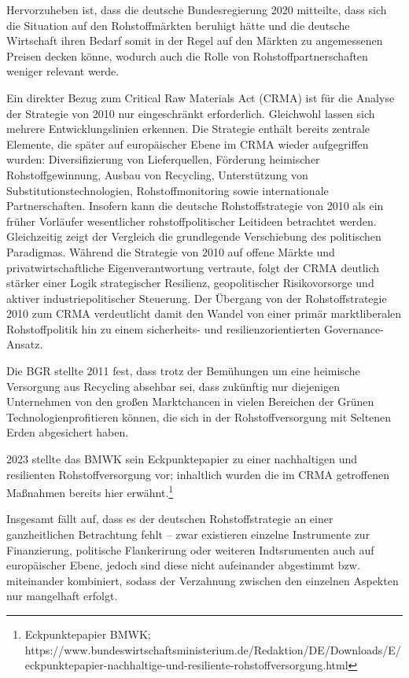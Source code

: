 \documentclass[12pt,a4paper,oneside]{book} %
\begin{document}
Hervorzuheben ist, dass die deutsche Bundesregierung 2020 mitteilte, dass sich die Situation auf den Rohstoffmärkten beruhigt hätte und die deutsche Wirtschaft ihren Bedarf somit in der Regel auf den Märkten zu angemessenen Preisen decken könne, wodurch auch die Rolle von Rohstoffpartnerschaften weniger relevant werde.\autocite{Bundesrechnungshof, Rohstoffpartnerschaften, 2021, S. 10; BtDrs 19/17224}

Ein direkter Bezug zum Critical Raw Materials Act (CRMA) ist für die Analyse der Strategie von 2010 nur eingeschränkt erforderlich. Gleichwohl lassen sich mehrere Entwicklungslinien erkennen.
Die Strategie enthält bereits zentrale Elemente, die später auf europäischer Ebene im CRMA wieder aufgegriffen wurden: Diversifizierung von Lieferquellen, Förderung heimischer Rohstoffgewinnung, Ausbau von Recycling, Unterstützung von Substitutionstechnologien, Rohstoffmonitoring sowie internationale Partnerschaften. Insofern kann die deutsche Rohstoffstrategie von 2010 als ein früher Vorläufer wesentlicher rohstoffpolitischer Leitideen betrachtet werden. Gleichzeitig zeigt der Vergleich die grundlegende Verschiebung des politischen Paradigmas. Während die Strategie von 2010 auf offene Märkte und privatwirtschaftliche Eigenverantwortung vertraute, folgt der CRMA deutlich stärker einer Logik strategischer Resilienz, geopolitischer Risikovorsorge und aktiver industriepolitischer Steuerung. Der Übergang von der Rohstoffstrategie 2010 zum CRMA verdeutlicht damit den Wandel von einer primär marktliberalen Rohstoffpolitik hin zu einem sicherheits- und resilienzorientierten Governance-Ansatz.

Die BGR stellte 2011 fest, dass trotz der Bemühungen um eine heimische Versorgung aus Recycling absehbar sei, dass \glqq zukünftig nur diejenigen Unternehmen von den großen Marktchancen in vielen Bereichen der \glq Grünen Technologien\grq profitieren können, die sich in der Rohstoffversorgung mit Seltenen Erden abgesichert haben\grqq.\autocite{Top Commodity News 36, S. 8}


2023 stellte das BMWK sein Eckpunktepapier zu einer nachhaltigen und resilienten Rohstoffversorgung vor; inhaltlich wurden die im CRMA getroffenen Maßnahmen bereits hier erwähnt.\footnote{Eckpunktepapier BMWK; https://www.bundeswirtschaftsministerium.de/Redaktion/DE/Downloads/E/eckpunktepapier-nachhaltige-und-resiliente-rohstoffversorgung.html}

Insgesamt fällt auf, dass es der deutschen Rohstoffstrategie an einer ganzheitlichen Betrachtung fehlt -- zwar existieren einzelne Instrumente zur Finanzierung, politische Flankerirung oder weiteren Indtsrumenten auch auf europäischer Ebene, jedoch sind diese nicht aufeinander abgestimmt bzw. miteinander kombiniert, sodass der Verzahnung zwischen den einzelnen Aspekten nur mangelhaft erfolgt.
\end{document}
